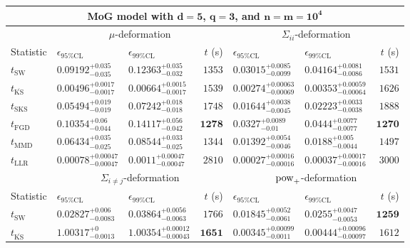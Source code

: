 \begin{tabular}{l|llr|llr}
	\toprule
	\multicolumn{7}{c}{{\bf MoG model with $\mathbf{d=5}$, $\mathbf{q=3}$, and $\mathbf{n=m=10^{4}}$}} \\
	\toprule
	\multicolumn{1}{c}{} & \multicolumn{3}{c}{$\mu$-deformation} & \multicolumn{3}{c}{$\Sigma_{ii}$-deformation} \\
	Statistic & $\epsilon_{95\%\mathrm{CL}}$ & $\epsilon_{99\%\mathrm{CL}}$ & $t$ (s) & $\epsilon_{95\%\mathrm{CL}}$ & $\epsilon_{99\%\mathrm{CL}}$ & $t$ (s) \\
	\midrule
	$t_{\mathrm{SW}}$ & $0.09192_{-0.035}^{+0.035}$ & $0.12363_{-0.032}^{+0.035}$ & $1353$ & $0.03015_{-0.0099}^{+0.0085}$ & $0.04164_{-0.0086}^{+0.0081}$ & $1531$ \\
	$t_{\overline{\mathrm{KS}}}$ & ${\mathbf{0.00496_{-0.0017}^{+0.0017}}}$ & ${\mathbf{0.00664_{-0.0017}^{+0.0015}}}$ & $1539$ & ${\mathbf{0.00274_{-0.00069}^{+0.00063}}}$ & ${\mathbf{0.00353_{-0.00064}^{+0.00059}}}$ & $1626$ \\
	$t_{\mathrm{SKS}}$ & $0.05494_{-0.019}^{+0.019}$ & $0.07242_{-0.018}^{+0.018}$ & $1748$ & $0.01644_{-0.0045}^{+0.0038}$ & $0.02223_{-0.0038}^{+0.0033}$ & $1888$ \\
	$t_{\mathrm{FGD}}$ & $0.10354_{-0.044}^{+0.06}$ & $0.14117_{-0.042}^{+0.056}$ & ${\mathbf{1278}}$ & $0.0327_{-0.01}^{+0.0089}$ & $0.0444_{-0.0077}^{+0.0077}$ & ${\mathbf{1270}}$ \\
	$t_{\mathrm{MMD}}$ & $0.06434_{-0.025}^{+0.035}$ & $0.08544_{-0.025}^{+0.033}$ & $1344$ & $0.01392_{-0.0046}^{+0.0054}$ & $0.0188_{-0.0044}^{+0.005}$ & $1497$ \\
	$t_{\mathrm{LLR}}$ & $0.00078_{-0.00047}^{+0.00047}$ & $0.0011_{-0.00047}^{+0.00047}$ & $2810$ & $0.00027_{-0.00016}^{+0.00016}$ & $0.00037_{-0.00016}^{+0.00017}$ & $3000$ \\
	\toprule
	\multicolumn{1}{c}{} & \multicolumn{3}{c}{$\Sigma_{i\neq j}$-deformation} & \multicolumn{3}{c}{$\rm{pow}_{+}$-deformation} \\
	Statistic & $\epsilon_{95\%\mathrm{CL}}$ & $\epsilon_{99\%\mathrm{CL}}$ & $t$ (s) & $\epsilon_{95\%\mathrm{CL}}$ & $\epsilon_{99\%\mathrm{CL}}$ & $t$ (s) \\
	\midrule
	$t_{\mathrm{SW}}$ & $0.02827_{-0.0083}^{+0.006}$ & $0.03864_{-0.0063}^{+0.0056}$ & $1766$ & $0.01845_{-0.0061}^{+0.0052}$ & $0.0255_{-0.0053}^{+0.0047}$ & ${\mathbf{1259}}$ \\
	$t_{\overline{\mathrm{KS}}}$ & $1.00317_{-0.0013}^{+0}$ & $1.00354_{-0.00043}^{+0.00012}$ & ${\mathbf{1651}}$ & ${\mathbf{0.00345_{-0.0011}^{+0.00099}}}$ & ${\mathbf{0.00444_{-0.00097}^{+0.00096}}}$ & $1612$ \\

\end{tabular}
